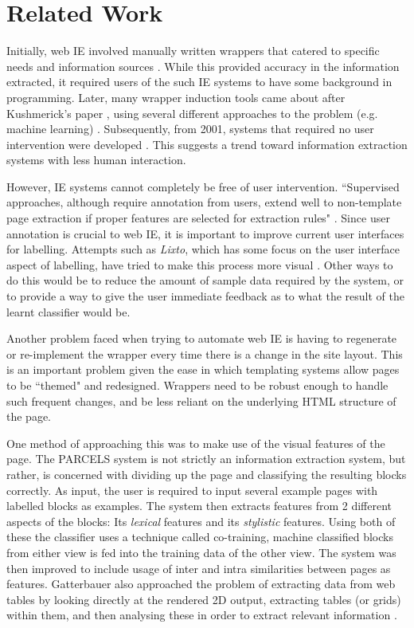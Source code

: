 \documentclass[a4paper,12pt]{article}
\begin{document}
\section{Related Work}
	Initially, web IE involved manually written wrappers that catered to specific needs and information sources \cite{Chawathe1994,Perkowitz1995} . While this provided accuracy in the information extracted, it required users of the such IE systems to have some background in programming. Later, many wrapper induction tools came about after Kushmerick's paper \cite{Kushmerick1997}, using several different approaches to the problem (e.g. machine learning) \cite{Freitag1998,Soderland}. Subsequently, from 2001, systems that required no user intervention were developed \cite{Chang2001,Crescenzi2002,Arasu2003}. This suggests a trend toward information extraction systems with less human interaction.
	
	However, IE systems cannot completely be free of user intervention. ``Supervised approaches, although require annotation from users, extend well to non-template page extraction if proper features are selected for extraction rules" \cite{Kayed2006}. Since user annotation is crucial to web IE, it is important to improve current user interfaces for labelling. Attempts such as \textit{Lixto}, which has some focus on the user interface aspect of labelling, have tried to make this process more visual \cite{Baumgartner2001}. Other ways to do this would be to reduce the amount of sample data required by the system, or to provide a way to give the user immediate feedback as to what the result of the learnt classifier would be.

	Another problem faced when trying to automate web IE is having to regenerate or re-implement the wrapper every time there is a change in the site layout. This is an important problem given the ease in which templating systems allow pages to be ``themed" and redesigned. Wrappers need to be robust enough to handle such frequent changes, and be less reliant on the underlying HTML structure of the page.
	
	One method of approaching this was to make use of the visual features of the page. The PARCELS system is not strictly an information extraction system, but rather, is concerned with dividing up the page and classifying the resulting blocks correctly. As input, the user is required to input several example pages with labelled blocks as examples. The system then extracts features from 2 different aspects of the blocks: Its \textit{lexical} features and its \textit{stylistic} features. Using both of these the classifier uses a technique called co-training, machine classified blocks from either view is fed into the training data of the other view\cite{Lee2004}. The system was then improved to include usage of inter and intra similarities between pages as features\cite{AikMiang2005}. Gatterbauer also approached the problem of extracting data from web tables by looking directly at the rendered 2D output, extracting tables (or grids) within them, and then analysing these in order to extract relevant information \cite{Gatterbauer2007}.
	
\end{document}
